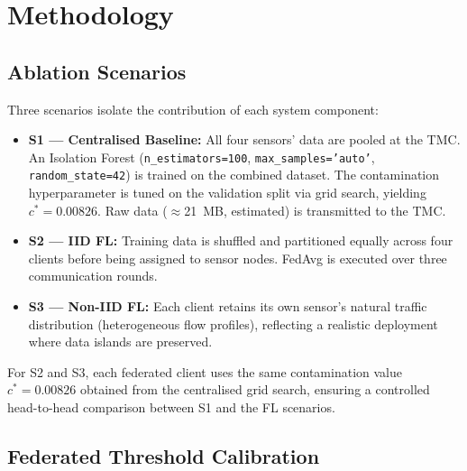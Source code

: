 \documentclass[conference]{IEEEtran}
\begin{document}
\section{Methodology}

\subsection{Ablation Scenarios}

Three scenarios isolate the contribution of each system component:

\begin{itemize}
  \item \textbf{S1 --- Centralised Baseline:} All four sensors' data are
        pooled at the TMC\@. An Isolation Forest
        (\texttt{n\_estimators=100}, \texttt{max\_samples='auto'},
        \texttt{random\_state=42}) is trained on the combined dataset.
        The contamination hyperparameter is tuned on the validation
        split via grid search, yielding $c^*=0.00826$.
        Raw data ($\approx$21~MB, estimated) is transmitted to the TMC.
  \item \textbf{S2 --- IID FL:} Training data is shuffled and partitioned
        equally across four clients before being assigned to sensor nodes.
        FedAvg is executed over three communication rounds.
  \item \textbf{S3 --- Non-IID FL:} Each client retains its own sensor's
        natural traffic distribution (heterogeneous flow profiles),
        reflecting a realistic deployment where data islands are preserved.
\end{itemize}

For S2 and S3, each federated client uses the same contamination value
$c^*=0.00826$ obtained from the centralised grid search, ensuring a
controlled head-to-head comparison between S1 and the FL scenarios.

\subsection{Federated Threshold Calibration}
\end{document}
